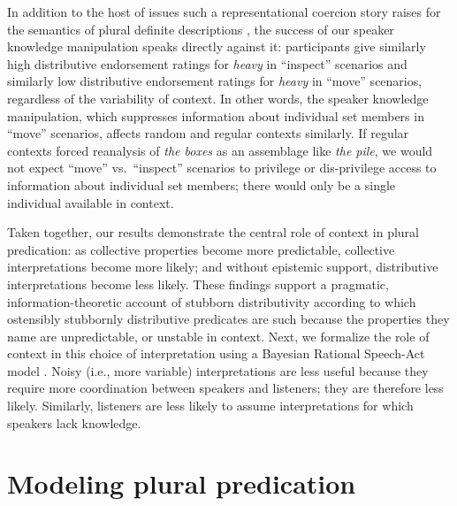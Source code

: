 \documentclass[linguex]{sp}
\begin{document}
In addition to the host of issues such a representational coercion story raises for the semantics of plural definite descriptions \citep[for discussion, see ][]{link1983,landman1989,schwarzschild1996,link1998}, the success of our speaker knowledge manipulation speaks directly against it: participants give similarly high distributive endorsement ratings for \emph{heavy} in ``inspect'' scenarios and similarly low distributive endorsement ratings for \emph{heavy} in ``move'' scenarios, regardless of the variability of context. In other words, the speaker knowledge manipulation, which suppresses information about individual set members in ``move'' scenarios, affects random and regular contexts similarly. If regular contexts forced reanalysis of \emph{the boxes} as an assemblage like \emph{the pile}, we would not expect ``move'' vs.~``inspect'' scenarios to privilege or dis-privilege access to information about individual set members; there would only be a single individual available in context.

Taken together, our results demonstrate the central role of context in plural predication: as collective properties become more predictable, collective interpretations become more likely; and without epistemic support, distributive interpretations become less likely. These findings support a pragmatic, information-theoretic account of stubborn distributivity according to which ostensibly stubbornly distributive predicates are such because the properties they name are unpredictable, or unstable in context. Next, we formalize the role of context in this choice of interpretation using a Bayesian Rational Speech-Act model \citep{frankgoodman2012,lassitergoodman2013}. Noisy (i.e., more variable) interpretations are less useful because they require more coordination between speakers and listeners; they are therefore less likely. Similarly, listeners are less likely to assume interpretations for which speakers lack knowledge.



\section{Modeling plural predication}
\end{document}
